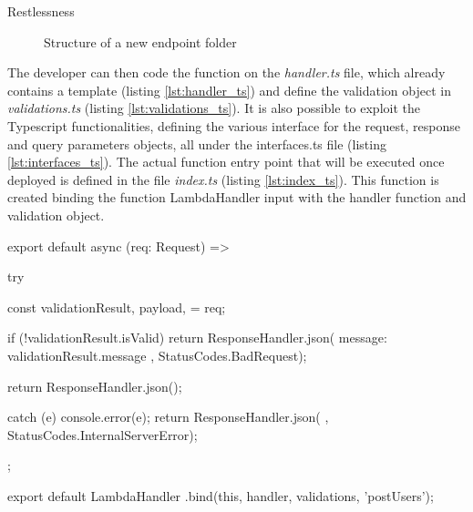 \begin{chapter}{Restlessness}
    \begin{figure}
        \begin{minipage}{\linewidth}
        \end{minipage}
        \caption{Structure of a new endpoint folder}
        \label{fig:new_endpoint_folder_structure}
    \end{figure}

    The developer can then code the function on the \textit{handler.ts} file, which
    already contains a template (listing \ref{lst:handler_ts}) and define the
    validation object in \textit{validations.ts} (listing \ref{lst:validations_ts}).
    It is also possible to exploit the Typescript functionalities, defining the various
    interface for the request, response and query parameters objects, all under the
    interfaces.ts file (listing \ref{lst:interfaces_ts}).
    The actual function entry point that will be executed once deployed is defined
    in the file \textit{index.ts} (listing \ref{lst:index_ts}). This function is
    created binding the function LambdaHandler input with the handler function and
    validation object.

    \clearpage

    \begin{code}[caption=handler.ts content, label={lst:handler_ts}]
export default async (req: Request) => {
  try {
    const {
        validationResult,
        payload,
    } = req;

    if (!validationResult.isValid) {
        return ResponseHandler.json({
            message: validationResult.message
        }, StatusCodes.BadRequest);
    }

    return ResponseHandler.json({});
  } catch (e) {
    console.error(e);
    return ResponseHandler.json(
        {}, StatusCodes.InternalServerError);
  }
};
    \end{code}

    \bigskip
    \begin{code}[caption=index.ts content, label={lst:index_ts}]
export default LambdaHandler
    .bind(this, handler, validations, 'postUsers');
    \end{code}


\end{chapter}
